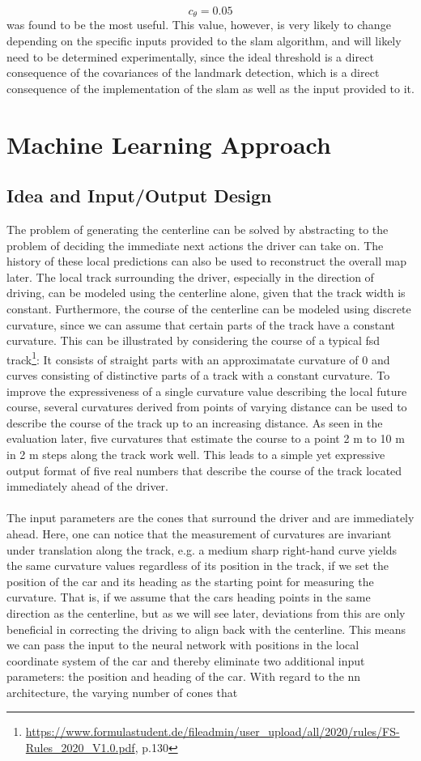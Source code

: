 $$c_\theta = 0.05$$
was found to be the most useful. This value, however, is very likely to change depending on the specific inputs provided to the \ac{slam} algorithm, and will likely need to be determined experimentally, since the ideal threshold is a direct consequence of the covariances of the landmark detection, which is a direct consequence of the implementation of the \ac{slam} as well as the input provided to it.


\section{Machine Learning Approach}
\subsection{Idea and Input/Output Design}
The problem of generating the centerline can be solved by abstracting to the problem of deciding the immediate next actions the driver can take on. The history of these local predictions can also be used to reconstruct the overall map later. The local track surrounding the driver, especially in the direction of driving, can be modeled using the centerline alone, given that the track width is constant. Furthermore, the course of the centerline can be modeled using discrete curvature, since we can assume that certain parts of the track have a constant curvature. This can be illustrated by considering the course of a typical \ac{fsd} track\footnote{\url{https://www.formulastudent.de/fileadmin/user_upload/all/2020/rules/FS-Rules_2020_V1.0.pdf}, p.130}: It consists of straight parts with an approximatate curvature of 0 and curves consisting of distinctive parts of a track with a constant curvature. To improve the expressiveness of a single curvature value describing the local future course, several curvatures derived from points of varying distance can be used to describe the course of the track up to an increasing distance. As seen in the evaluation later, five curvatures that estimate the course to a point 2 m to 10 m in 2 m steps along the track work well. This leads to a simple yet expressive output format of five real numbers that describe the course of the track located immediately ahead of the driver. \\\\The input parameters are the cones that surround the driver and are immediately ahead. Here, one can notice that the measurement of curvatures are invariant under translation along the track, e.g. a medium sharp right-hand curve yields the same curvature values regardless of its position in the track, if we set the position of the car and its heading as the starting point for measuring the curvature. That is, if we assume that the cars heading points in the same direction as the centerline, but as we will see later, deviations from this are only beneficial in correcting the driving to align back with the centerline. This means we can pass the input to the neural network with positions in the local coordinate system of the car and thereby eliminate two additional input parameters: the position and heading of the car. With regard to the \ac{nn} architecture, the varying number of cones that 